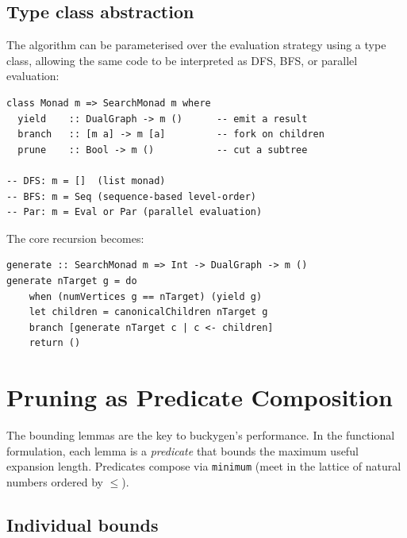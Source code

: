 \documentclass[11pt,a4paper]{article}
\theoremstyle{definition}
\begin{document}
\subsection{Type class abstraction}

The algorithm can be parameterised over the evaluation strategy using a
type class, allowing the same code to be interpreted as DFS, BFS, or
parallel evaluation:

\begin{lstlisting}
class Monad m => SearchMonad m where
  yield    :: DualGraph -> m ()      -- emit a result
  branch   :: [m a] -> m [a]         -- fork on children
  prune    :: Bool -> m ()           -- cut a subtree

-- DFS: m = []  (list monad)
-- BFS: m = Seq (sequence-based level-order)
-- Par: m = Eval or Par (parallel evaluation)
\end{lstlisting}

The core recursion becomes:

\begin{lstlisting}
generate :: SearchMonad m => Int -> DualGraph -> m ()
generate nTarget g = do
    when (numVertices g == nTarget) (yield g)
    let children = canonicalChildren nTarget g
    branch [generate nTarget c | c <- children]
    return ()
\end{lstlisting}

\section{Pruning as Predicate Composition}
\label{sec:bounds}

The bounding lemmas are the key to buckygen's performance.  In the
functional formulation, each lemma is a \emph{predicate} that bounds
the maximum useful expansion length.  Predicates compose via
\texttt{minimum} (meet in the lattice of natural numbers ordered by
$\le$).

\subsection{Individual bounds}
\end{document}
